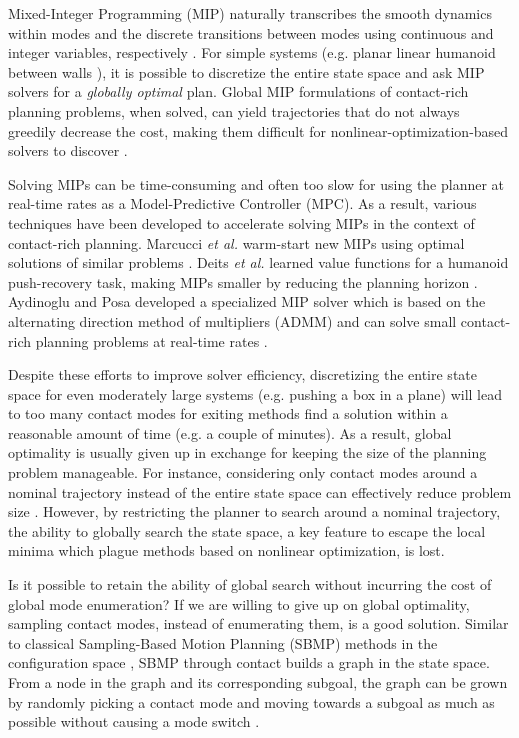 Mixed-Integer Programming (MIP) \cite{bertsimas1997introduction} naturally transcribes the smooth dynamics within modes and the discrete transitions between modes using continuous and integer variables, respectively \cite{marcucci2019mixed}. For simple systems (e.g. planar linear humanoid between walls \cite{marcucci2017approximate}), it is possible to discretize the entire state space and ask MIP solvers for a \emph{globally optimal} plan. Global MIP formulations of contact-rich planning problems, when solved, can yield trajectories that do not always greedily decrease the cost, making them difficult for nonlinear-optimization-based solvers to discover \cite{marcucci2019mixed}. 

Solving MIPs can be time-consuming and often too slow for using the planner at real-time rates as a Model-Predictive Controller (MPC). As a result, various techniques have been developed to accelerate solving MIPs in the context of contact-rich planning. Marcucci \textit{et al.} warm-start new MIPs using optimal solutions of similar problems \cite{marcucci2020warm}. Deits \textit{et al.} learned value functions for a humanoid push-recovery task, making MIPs smaller by reducing the planning horizon \cite{deits2019lvis}. Aydinoglu and Posa developed a specialized MIP solver which is based on the alternating direction method of multipliers (ADMM) and can solve small contact-rich planning problems at real-time rates \cite{aydinoglu2022real}. 

Despite these efforts to improve solver efficiency, discretizing the entire state space for even moderately large systems (e.g. pushing a box in a plane) will lead to too many contact modes for exiting methods find a solution within a reasonable amount of time (e.g. a couple of minutes). As a result, global optimality is usually given up in exchange for keeping the size of the planning problem manageable. For instance, considering only contact modes around a nominal trajectory instead of the entire state space can effectively reduce problem size \cite{hogan2020feedback, aceituno2020global}. However, by restricting the planner to search around a nominal trajectory, the ability to globally search the state space, a key feature to escape the local minima which plague methods based on nonlinear optimization, is lost. 

Is it possible to retain the ability of global search without incurring the cost of global mode enumeration? If we are willing to give up on global optimality, sampling contact modes, instead of enumerating them, is a good solution. Similar to classical Sampling-Based Motion Planning (SBMP) methods in the configuration space \cite{lavalle2006planning}, SBMP through contact builds a graph in the state space. From a node in the graph and its corresponding subgoal, the graph can be grown by randomly picking a contact mode and moving towards a subgoal as much as possible without causing a mode switch \cite{cheng2021contact, wu2020r3t}. 


